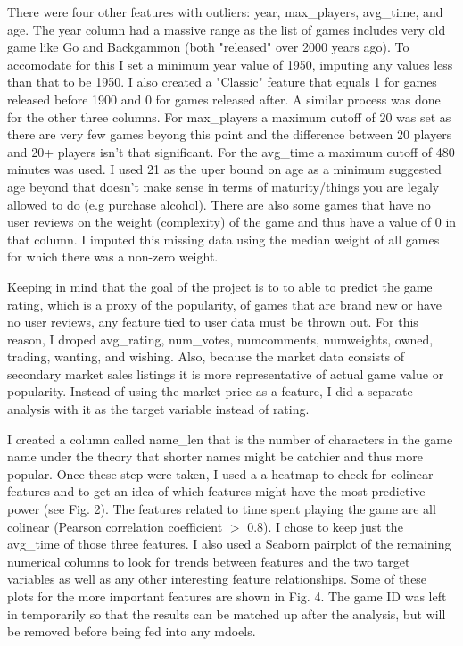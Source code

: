 \documentclass[12pt]{article}
\begin{document}
There were four other features with outliers: year, max\_players, avg\_time, and age. The year column had a massive range as the list of games includes very old game like Go and Backgammon (both "released" over 2000 years ago). To accomodate for this I set a minimum year value of 1950, imputing any values less than that to be 1950. I also created a "Classic" feature that equals 1 for games released before 1900 and 0 for games released after. A similar process was done for the other three columns. For max\_players a maximum cutoff of 20 was set as there are very few games beyong this point and the difference between 20 players and 20+ players isn't that significant. For the avg\_time a maximum cutoff of 480 minutes was used. I used 21 as the uper bound on age as a minimum suggested age beyond that doesn't make sense in terms of maturity/things you are legaly allowed to do (e.g purchase alcohol). There are also some games that have no user reviews on the weight (complexity) of the game and thus have a value of 0 in that column. I imputed this missing data using the median weight of all games for which there was a non-zero weight.

Keeping in mind that the goal of the project is to to able to predict the game rating, which is a proxy of the popularity, of games that are brand new or have no user reviews, any feature tied to user data must be thrown out. For this reason, I droped avg\_rating, num\_votes, numcomments, numweights, owned, trading, wanting, and wishing. Also, because the market data consists of secondary market sales listings it is more representative of actual game value or popularity. Instead of using the market price as a feature, I did a separate analysis with it as the target variable instead of rating. 

I created a column called name\_len that is the number of characters in the game name under the theory that shorter names might be catchier and thus more popular. Once these step were taken, I used a a heatmap to check for colinear features and to get an idea of which features might have the most predictive power (see Fig. 2). The features related to time spent playing the game are all colinear (Pearson correlation coefficient $>$ 0.8). I chose to keep just the avg\_time of those three features. I also used a Seaborn pairplot of the remaining numerical columns to look for trends between features and the two target variables as well as any other interesting feature relationships. Some of these plots for the more important features are shown in Fig. 4. The game ID was left in temporarily so that the results can be matched up after the analysis, but will be removed before being fed into any mdoels.
\end{document}
